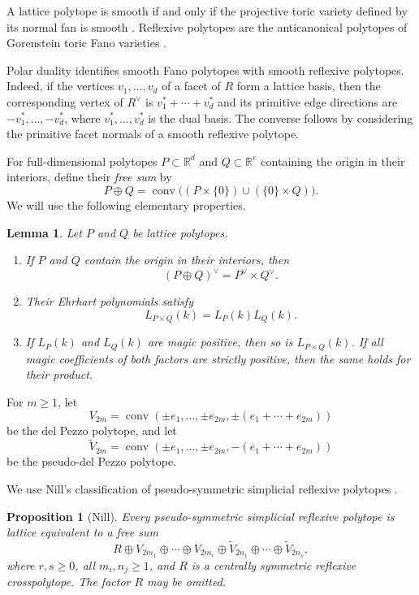 \documentclass[12pt]{amsart}
\newtheorem{Lemma}[Theorem]{Lemma}
\newtheorem{Proposition}[Theorem]{Proposition}
\theoremstyle{definition}
\newcommand{\RR}{\mathbb R}
\newcommand{\conv}{\operatorname{conv}}
\begin{document}
A lattice polytope is smooth if and only if the projective toric
variety defined by its normal fan is smooth
\cite[Theorem~2.4.3]{CoxLittleSchenck}.
Reflexive polytopes are the anticanonical polytopes of Gorenstein
toric Fano varieties
\cite[Theorem~8.3.4]{CoxLittleSchenck}.

Polar duality identifies smooth Fano polytopes with smooth reflexive
polytopes.
Indeed, if the vertices $v_1,\ldots,v_d$ of a facet of $R$ form a
lattice basis, then the corresponding vertex of $R^\vee$ is
$v_1^*+\cdots+v_d^*$ and its primitive edge directions are
$-v_1^*,\ldots,-v_d^*$, where $v_1^*,\ldots,v_d^*$ is the dual basis.
The converse follows by considering the primitive facet normals
of a smooth reflexive polytope.

For full-dimensional polytopes $P\subset\RR^d$ and $Q\subset\RR^e$
containing the origin in their interiors, define their \emph{free sum} by
\[
P\oplus Q
=
\conv\bigl((P\times\{0\})\cup(\{0\}\times Q)\bigr).
\]
We will use the following elementary properties.

\begin{Lemma}\label{lem:closure}
Let $P$ and $Q$ be lattice polytopes.
\begin{enumerate}
\item If $P$ and $Q$ contain the origin in their interiors, then
\[
(P\oplus Q)^\vee=P^\vee\times Q^\vee.
\]
\item Their Ehrhart polynomials satisfy
\[
L_{P\times Q}(k)=L_P(k)L_Q(k).
\]
\item If $L_P(k)$ and $L_Q(k)$ are magic positive, then so is
$L_{P\times Q}(k)$.
If all magic coefficients of both factors are strictly positive,
then the same holds for their product.
\end{enumerate}
\end{Lemma}


For $m\ge1$, let
\[
V_{2m}
=
\conv\left(
\pm e_1,\ldots,\pm e_{2m},
\pm(e_1+\cdots+e_{2m})
\right)
\]
be the del Pezzo polytope, and let
\[
\widetilde V_{2m}
=
\conv\left(
\pm e_1,\ldots,\pm e_{2m},
-(e_1+\cdots+e_{2m})
\right)
\]
be the pseudo-del Pezzo polytope. 

We use Nill's classification of pseudo-symmetric simplicial reflexive
polytopes \cite[Theorem~0.1]{NillPseudoSymmetric}.

\begin{Proposition}[Nill]\label{prop:classification}
Every pseudo-symmetric simplicial reflexive polytope is lattice
equivalent to a free sum
\[
R
\oplus
V_{2m_1}\oplus\cdots\oplus V_{2m_r}
\oplus
\widetilde V_{2n_1}\oplus\cdots\oplus\widetilde V_{2n_s},
\]
where $r,s\ge0$, all $m_i,n_j\ge1$, and $R$ is a centrally symmetric
reflexive crosspolytope.  The factor $R$ may be omitted.
\end{Proposition}
\end{document}
